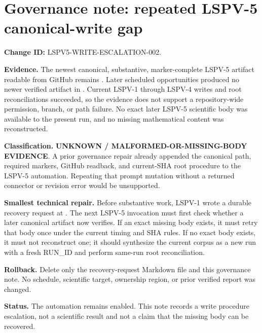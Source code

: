 \documentclass[11pt]{article}
\begin{document}
\section*{Governance note: repeated LSPV-5 canonical-write gap}

\textbf{Change ID:} LSPV5-WRITE-ESCALATION-002.

\textbf{Evidence.}  The newest canonical, substantive, marker-complete LSPV-5
artifact readable from GitHub remains
.  Later scheduled
opportunities produced no newer verified artifact in .
Current LSPV-1 through LSPV-4 writes and root reconciliations succeeded, so
the evidence does not support a repository-wide permission, branch, or path
failure.  No exact later LSPV-5 scientific body was available to the present
run, and no missing mathematical content was reconstructed.

\textbf{Classification.}  \textbf{UNKNOWN / MALFORMED-OR-MISSING-BODY
EVIDENCE}.  A prior governance repair already appended the canonical path,
required markers, GitHub readback, and current-SHA root procedure to the LSPV-5
automation.  Repeating that prompt mutation without a returned connector or
revision error would be unsupported.

\textbf{Smallest technical repair.}  Before substantive work, LSPV-1 wrote a
durable recovery request at
.
The next LSPV-5 invocation must first check whether a later canonical artifact
now verifies.  If an exact missing body exists, it must retry that body once
under the current  timing and SHA rules.  If no exact body
exists, it must not reconstruct one; it should synthesize the current corpus
as a new run with a fresh RUN\_ID and perform same-run root reconciliation.

\textbf{Rollback.}  Delete only the recovery-request Markdown file and this
governance note.  No schedule, scientific target, ownership region, or prior
verified report was changed.

\textbf{Status.}  The automation remains enabled.  This note records a write
procedure escalation, not a scientific result and not a claim that the
missing body can be recovered.

\end{document}

